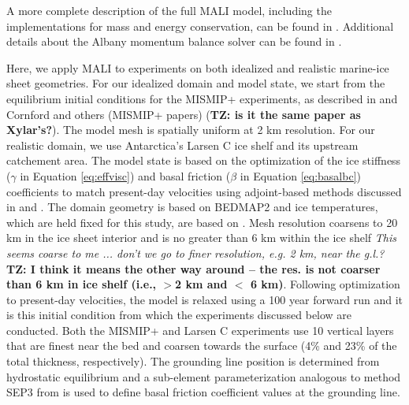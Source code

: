 \documentclass[review,oneside]{igs}
\begin{document}
A more complete description of the full MALI model, including the implementations for mass and energy conservation, can be found in \cite{hoffman2018}. Additional details about the Albany momentum balance solver can be found in \cite{tezaur2015a,tezaur2015b}. 

Here, we apply MALI to experiments on both idealized and realistic marine-ice sheet geometries. For our idealized domain and model state, we start from the equilibrium initial conditions for the MISMIP+ experiments, as described in \cite{asay2016} and Cornford and others (MISMIP+ papers) ({\bf{TZ: is it the same paper as Xylar's?}}). The model mesh is spatially uniform at 2 km resolution. For our realistic domain, we use Antarctica's Larsen C ice shelf and its upstream catchement area. The model state is based on the optimization of the ice stiffness ($\gamma$ in Equation \ref{eq:effvisc}) and basal friction ($\beta$ in Equation \ref{eq:basalbc}) coefficients to match present-day velocities \citep{rignot2014} using adjoint-based methods discussed in \cite{perego2014} and \cite{hoffman2018}. The domain geometry is based on BEDMAP2 \citep{fretwell2013} and ice temperatures, which are held fixed for this study, are based on \cite{liefferinge2013}. Mesh resolution coarsens to 20 km in the ice sheet interior and is no greater than 6 km within the ice shelf \textit{This seems coarse to me ... don't we go to finer resolution, e.g. 2 km, near the g.l.?} {\bf{TZ: I think it means the other way around -- the res. is not coarser than 6 km in ice shelf (i.e., $>$2 km and $<$ 6 km)}}. Following optimization to present-day velocities, the model is relaxed using a 100 year forward run and it is this initial condition from which the experiments discussed below are conducted. Both the MISMIP+ and Larsen C experiments use 10 vertical layers that are finest near the bed and coarsen towards the surface (4\% and 23\% of the total thickness, respectively). The grounding line position is determined from hydrostatic equilibrium and a sub-element parameterization analogous to method SEP3 from \cite{seroussi2014} is used to define basal friction coefficient values at the grounding line. 

\end{document}
